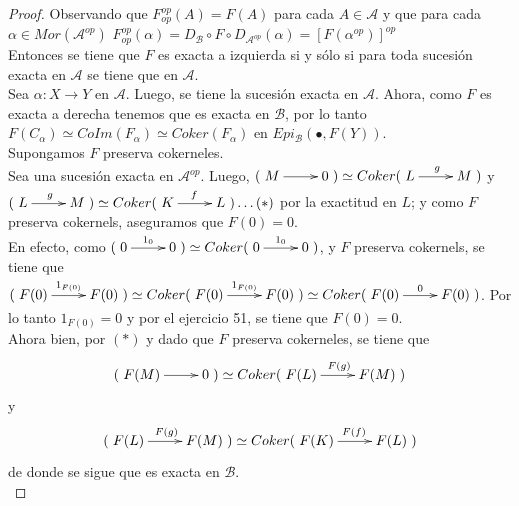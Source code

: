 \documentclass{article}
\begin{document}
\begin{enumerate}[label=\textbf{Ej \arabic*.}]
\begin{proof}
Observando que $F_{op}^{op}(A)=F(A)$ para cada $A\in \mathscr{A}$ y que para cada \\

$\alpha\in Mor( \mathscr{A}^{op})$ 
 $\displaystyle F_{op}^{op}(\alpha)=D_{\mathscr{B}}\circ F\circ D_{\mathscr{A}^{op}}(\alpha)=[F(\alpha^{op})]^{op}$\\

Entonces se tiene que $F$ es exacta a izquierda si y sólo si para toda sucesión exacta 
 en $\mathscr{A}$ se tiene que 
 en $\mathscr{A}$.\\

 Sea $\alpha:X\to Y$ en $\mathscr{A}$. Luego, se tiene la sucesión exacta 
 en $\mathscr{A}$. Ahora, como $F$ es exacta a derecha tenemos que 
 es exacta en $\mathscr{B}$, por lo tanto 
$F(C_\alpha)\simeq CoIm(F_\alpha)\simeq Coker(F_\alpha)$ en $Epi_{\mathscr{B}}(\bullet,F(Y))$.\\

 Supongamos $F$ preserva cokerneles.\\

Sea   una sucesión exacta en $\mathscr{A}^{op}$. Luego,
$(\xymatrix{M\ar[r]&0})\simeq Coker(\xymatrix{L\ar[r]^g&M})$ \quad y\\
$(\xymatrix{L\ar[r]^g&M})\simeq Coker(\xymatrix{K\ar[r]^f&L})\ldots (*)$ 
por la exactitud en $L$; y como $F$ preserva cokernels, aseguramos que $F(0)=0$. \\

En efecto, como 
$(\xymatrix{0\ar[r]^{1_0}&0})\simeq Coker(\xymatrix{0\ar[r]^{1_0}&0})$, y $F$ preserva cokernels, se tiene que \\
$(\xymatrix{F(0)\ar[r]^{1_{F(0)}}&F(0)})\simeq Coker(\xymatrix{F(0)\ar[r]^{1_{F(0)}}&F(0)})\simeq Coker(\xymatrix{F(0)\ar[r]^0&F(0)})$.
Por lo tanto $1_{F(0)}=0$ y por el ejercicio 51, se tiene que $F(0)=0$.\\

Ahora bien, por $(*)$ y dado que $F$ preserva cokerneles, se tiene que 
\[(\xymatrix{F(M)\ar[r]&0})\simeq Coker(\xymatrix{F(L)\ar[r]^{F(g)}&F(M)})\] y
\[(\xymatrix{F(L)\ar[r]^{F(g)}&F(M)})\simeq Coker(\xymatrix{F(K)\ar[r]^{F(f)}&F(L)})\] de donde se sigue que 
 es exacta en $\mathscr{B}$.\\


\end{proof}
\end{enumerate}
\end{document}

